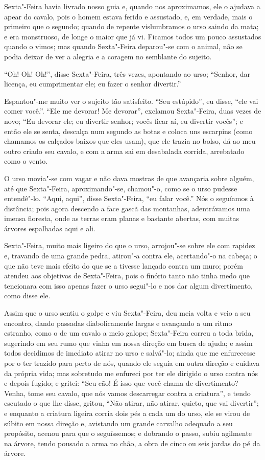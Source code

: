 Sexta"-Feira havia livrado nosso guia e, quando nos aproximamos, ele o
ajudava a apear do cavalo, pois o homem estava ferido e assustado, e, em
verdade, mais o primeiro que o segundo; quando de repente vislumbramos o
urso saindo da mata; e era monstruoso, de longe o maior que já vi.
Ficamos todos um pouco assustados quando o vimos; mas quando Sexta"-Feira
deparou"-se com o animal, não se podia deixar de ver a alegria e a
coragem no semblante do sujeito.

``Oh! Oh! Oh!'', disse Sexta"-Feira, três vezes, apontando ao urso;
``Senhor, dar licença, eu cumprimentar ele; eu fazer o senhor
divertir.''

Espantou"-me muito ver o sujeito tão satisfeito. ``Seu estúpido'', eu
disse, ``ele vai comer você.''. ``Ele me devorar! Me devorar'', exclamou
Sexta"-Feira, duas vezes de novo; ``Eu devorar ele; eu divertir senhor;
vocês ficar aí, eu divertir vocês''; e então ele se senta, descalça num
segundo as botas e coloca uns escarpins (como chamamos os calçados
baixos que eles usam), que ele trazia no bolso, dá ao meu outro criado
seu cavalo, e com a arma sai em desabalada corrida, arrebatado como o
vento.

O urso movia"-se com vagar e não dava mostras de que avançaria sobre
alguém, até que Sexta"-Feira, aproximando"-se, chamou"-o, como se o urso
pudesse entendê"-lo. ``Aqui, aqui'', disse Sexta"-Feira, ``eu falar
você.'' Nós o seguíamos à distância; pois agora descendo a face gascã
das montanhas, adentrávamos uma imensa floresta, onde as terras eram
planas e bastante abertas, com muitas árvores espalhadas aqui e ali.

Sexta"-Feira, muito mais ligeiro do que o urso, arrojou"-se sobre ele com
rapidez e, travando de uma grande pedra, atirou"-a contra ele,
acertando"-o na cabeça; o que não teve mais efeito do que se a tivesse
lançado contra um muro; porém atendeu aos objetivos de Sexta"-Feira, pois
o finório tanto não tinha medo que tencionara com isso apenas fazer o
urso segui"-lo e nos dar algum divertimento, como disse ele.

Assim que o urso sentiu o golpe e viu Sexta"-Feira, deu meia volta e veio
a seu encontro, dando passadas diabolicamente largas e avançando a um
ritmo estranho, como o de um cavalo a meio galope; Sexta"-Feira correu a
toda brida, sugerindo em seu rumo que vinha em nossa direção em busca de
ajuda; e assim todos decidimos de imediato atirar no urso e salvá"-lo;
ainda que me enfurecesse por o ter trazido para perto de nós, quando ele
seguia em outra direção e cuidava da própria vida; mas sobretudo me
enfureci por ter ele dirigido o urso contra nós e depois fugido; e
gritei: ``Seu cão! É isso que você chama de divertimento? Venha, tome
seu cavalo, que nós vamos descarregar contra a criatura'', e tendo
escutado o que lhe disse, gritou, ``Não atirar, não atirar, quieto, que
vai divertir''; e enquanto a criatura ligeira corria dois pés a cada um
do urso, ele se virou de súbito em nossa direção e, avistando um grande
carvalho adequado a seu propósito, acenou para que o seguíssemos; e
dobrando o passo, subiu agilmente na árvore, tendo pousado a arma no
chão, a obra de cinco ou seis jardas do pé da árvore.

